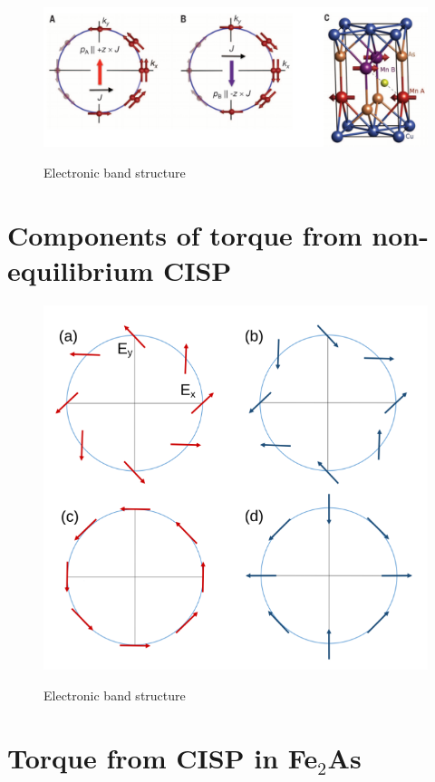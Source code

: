 \documentclass[11pt,edeposit,draftthesis]{uiucthesis2020}
\begin{document}
\begin{mainmatter}
\begin{figure}
\centering\includegraphics[width=\columnwidth]{figures/ch2/wadley_1.png} \\
\caption{\label{fig:wadley_1}
Electronic band structure
}
\end{figure}

\section{Components of torque from non-equilibrium CISP}



\begin{figure}
\centering\includegraphics[width=0.7\columnwidth]{figures/ch2/rashba_dresselhaus.png} \\
\caption{\label{fig:rashba_dresselhaus}
Electronic band structure
}
\end{figure}

\section{Torque from CISP in Fe$_2$As}


\end{mainmatter}
\end{document}
